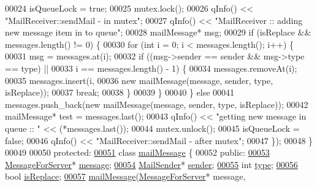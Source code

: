 \begin{DoxyCode}
00024       isQueueLock = \textcolor{keyword}{true};
00025       mutex.lock();
00026       qInfo() << \textcolor{stringliteral}{"MailReceiver::sendMail - in mutex"};
00027       qInfo() << \textcolor{stringliteral}{"MailReceiver :: adding new message item in to queue"};
00028       mailMessage* msg;
00029       \textcolor{keywordflow}{if} (isReplace && messages.length() != 0) \{
00030         \textcolor{keywordflow}{for} (\textcolor{keywordtype}{int} i = 0; i < messages.length(); i++) \{
00031           msg = messages.at(i);
00032           \textcolor{keywordflow}{if} ((msg->sender == sender && msg->type == type) ||
00033               i == messages.length() - 1) \{
00034             messages.removeAt(i);
00035             messages.insert(i,
00036                             \textcolor{keyword}{new} mailMessage(message, sender, type, isReplace));
00037             \textcolor{keywordflow}{break};
00038           \}
00039         \}
00040       \} \textcolor{keywordflow}{else}
00041         messages.push\_back(\textcolor{keyword}{new} mailMessage(message, sender, type, isReplace));
00042       mailMessage* test = messages.last();
00043       qInfo() << \textcolor{stringliteral}{"getting new message in queue :: "} << (*messages.last());
00044       mutex.unlock();
00045       isQueueLock = \textcolor{keyword}{false};
00046       qInfo() << \textcolor{stringliteral}{"MailReceiver::sendMail - after mutex"};
00047     \});
00048   \}
00049 
00050  \textcolor{keyword}{protected}:
\hyperlink{a00201}{00051}   \textcolor{keyword}{class} \hyperlink{a00201}{mailMessage} \{
00052    \textcolor{keyword}{public}:
\hyperlink{a00201_aa5878557546468fcfb65e099a5d4bf7d}{00053}     \hyperlink{a00121_a32f7c4034883ac363ca247c8a2843040}{MessageForServer}* \hyperlink{a00201_aa5878557546468fcfb65e099a5d4bf7d}{message};
\hyperlink{a00201_a048079ebd149bb973368fd5bedb528a7}{00054}     \hyperlink{a00205}{MailSender}* \hyperlink{a00201_a048079ebd149bb973368fd5bedb528a7}{sender};
\hyperlink{a00201_ad301da15808225e62d84fd5e3cf33a1f}{00055}     \textcolor{keywordtype}{int} \hyperlink{a00201_ad301da15808225e62d84fd5e3cf33a1f}{type};
\hyperlink{a00201_afb7ab5377a6aa4a1e3d836d3e464a952}{00056}     \textcolor{keywordtype}{bool} \hyperlink{a00201_afb7ab5377a6aa4a1e3d836d3e464a952}{isReplace};
\hyperlink{a00201_a0eaa6fb90637fea832337d73b9a83d4d}{00057}     \hyperlink{a00201_a0eaa6fb90637fea832337d73b9a83d4d}{mailMessage}(\hyperlink{a00121_a32f7c4034883ac363ca247c8a2843040}{MessageForServer}* message,

\end{DoxyCode}
